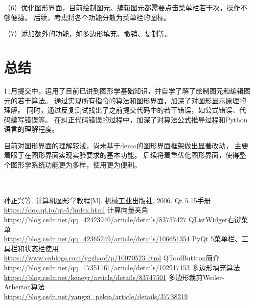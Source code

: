 \documentclass[a4paper,UTF8]{article}
\begin{document}
（6）优化图形界面，目前绘制图元、编辑图元都需要点击菜单栏若干次，操作不够便捷。
后续，考虑将各个功能分散为菜单栏的图标。

（7）添加额外的功能，如多边形填充、撤销、复制等。


\section{总结}
11月提交中，运用了目前已讲到图形学基础知识，并自学了解了绘制图元和编辑图元的若干算法。
通过实现所有指令的算法和图形界面，加深了对图形显示原理的理解。
同时，通过反复测试找出了之前提交代码中的若干错误，如公式错误、代码编写错误等。
在纠正代码错误的过程中，加深了对算法公式推导过程和Python语言的理解程度。

目前对图形界面的理解较浅，尚未基于demo的图形界面框架做出显著改动，
主要着眼于在图形界面实现实验要求的基本功能。
后续将着重优化图形界面，使得整个图形学系统功能更为多样，使用更为便利。
\\\\\\




\begin{thebibliography}{99}
 孙正兴等. 计算机图形学教程[M]. 机械工业出版社, 2006.
 Qt 5.15手册\\\url{https://doc.qt.io/qt-5/index.html}
 计算向量夹角\\\url{https://blog.csdn.net/qq_42423940/article/details/83757427}
 QListWidget右键菜单\\\url{https://blog.csdn.net/qq_42365249/article/details/106651354}
 PyQt 5菜单栏、工具栏和状态栏使用\\\url{https://www.cnblogs.com/ygzhaof/p/10070523.html}
 QToolButtton简介\\\url{https://blog.csdn.net/qq_17351161/article/details/102917153}
 多边形填充算法\\\url{https://blog.csdn.net/keneyr/article/details/83747501}
 多边形裁剪Weiler-Atherton算法\\\url{https://blog.csdn.net/yangxi_pekin/article/details/37738219} 
\end{thebibliography}
\end{document}
